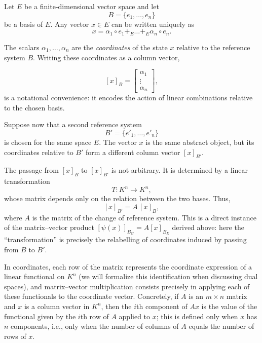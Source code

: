 \medskip


Let $E$ be a finite-dimensional vector space and let
\[
B=\{e_1,\dots,e_n\}
\]
be a basis of $E$. Any vector $x\in E$ can be written uniquely as
\[
x = \alpha_1 \circ e_1 +_E \dots +_E \alpha_n \circ e_n.
\]

The scalars $\alpha_1,\dots,\alpha_n$ are the \emph{coordinates} of the state $x$ relative to the reference system $B$. Writing these coordinates as a column vector,

\[
[x]_B =
\begin{bmatrix}
\alpha_1\\
\vdots\\
\alpha_n
\end{bmatrix},
\]
is a notational convenience: it encodes the action of linear combinations relative to the chosen basis.

\medskip

Suppose now that a second reference system
\[
B'=\{e'_1,\dots,e'_n\}
\]
is chosen for the same space $E$. The vector $x$ is the same abstract object, but its coordinates relative to $B'$ form a different column vector $[x]_{B'}$.

\medskip

The passage from $[x]_B$ to $[x]_{B'}$ is not arbitrary. It is determined by a linear transformation
\[
T : K^n \longrightarrow K^n,
\]
whose matrix depends only on the relation between the two bases. Thus,
\[
[x]_{B'} = A\,[x]_B,
\]
where $A$ is the matrix of the change of reference system.
This is a direct instance of the matrix--vector product $[\psi(x)]_{B_G} = A[x]_{B_E}$
derived above: here the ``transformation'' is precisely the relabelling of coordinates
induced by passing from $B$ to $B'$.

\medskip

In coordinates, each row of the matrix represents the coordinate expression of a linear functional on $K^n$ (we will formalize this identification when discussing dual spaces), and matrix--vector multiplication consists precisely in applying each of these functionals to the coordinate vector. Concretely, if $A$ is an $m\times n$ matrix and $x$ is a column vector in $K^n$, then the $i$th component of $Ax$ is the value of the functional given by the $i$th row of $A$ applied to $x$; this is defined only when $x$ has $n$ components, i.e., only when the number of columns of $A$ equals the number of rows of $x$.

